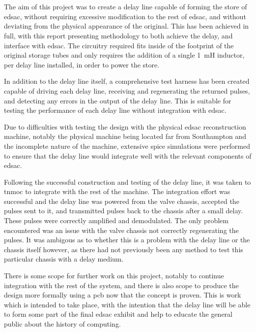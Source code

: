 \chapter{} \label{sec:conclusion}

The aim of this project was to create a delay line capable of forming the store of \gls{edsac}, without requiring excessive modification to the rest of \gls{edsac}, and without deviating from the physical appearance of the original. This has been achieved in full, with this report presenting methodology to both achieve the delay, and interface with \gls{edsac}. The circuitry required fits inside of the footprint of the original storage tubes and only requires the addition of a single \SI{1}{\milli\henry} inductor, per delay line installed, in order to power the store.

In addition to the delay line itself, a comprehensive test harness has been created capable of driving each delay line, receiving and regenerating the returned pulses, and detecting any errors in the output of the delay line. This is suitable for testing the performance of each delay line without integration with \gls{edsac}.

Due to difficulties with testing the design with the physical \gls{edsac} reconstruction machine, notably the physical machine being located far from Southampton and the incomplete nature of the machine, extensive \gls{spice} simulations were performed to ensure that the delay line would integrate well with the relevant components of \gls{edsac}.

Following the successful construction and testing of the delay line, it was taken to \gls{tnmoc} to integrate with the rest of the machine. The integration effort was successful and the delay line was powered from the valve chassis, accepted the pulses sent to it, and transmitted pulses back to the chassis after a small delay. These pulses were correctly amplified and demodulated. The only problem encountered was an issue with the valve chassis not correctly regenerating the pulses. It was ambigous as to whether this is a problem with the delay line or the chassis itself however, as there had not previously been any method to test this particular chassis with a delay medium.

There is some scope for further work on this project, notably to continue integration with the rest of the system, and there is also scope to produce the design more formally using a \gls{pcb} now that the concept is proven. This is work which is intended to take place, with the intention that the delay line will be able to form some part of the final \gls{edsac} exhibit and help to educate the general public about the history of computing.

